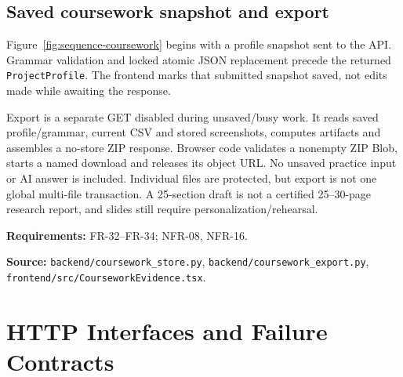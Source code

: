 \documentclass[11pt,a4paper]{article}
\newcommand{\viewtrace}[2]{\par\smallskip\noindent\textbf{Requirements:} #1.\par
  \noindent\textbf{Source:} #2.\par\medskip}
\begin{document}
\subsection{Saved coursework snapshot and export}
Figure~\ref{fig:sequence-coursework} begins with a profile snapshot sent to
the API. Grammar validation and locked atomic JSON replacement precede the
returned \texttt{ProjectProfile}. The frontend marks that submitted snapshot
saved, not edits made while awaiting the response.

Export is a separate GET disabled during unsaved/busy work. It reads saved
profile/grammar, current CSV and stored screenshots, computes artifacts and
assembles a no-store ZIP response. Browser code validates a nonempty ZIP Blob,
starts a named download and releases its object URL. No unsaved practice input
or AI answer is included. Individual files are protected, but export is not one
global multi-file transaction. A 25-section draft is not a certified 25--30-page
research report, and slides still require personalization/rehearsal.
\viewtrace{FR-32--FR-34; NFR-08, NFR-16}
{\nolinkurl{backend/coursework_store.py}, \nolinkurl{backend/coursework_export.py}, \nolinkurl{frontend/src/CourseworkEvidence.tsx}}

\section{HTTP Interfaces and Failure Contracts}
\end{document}
